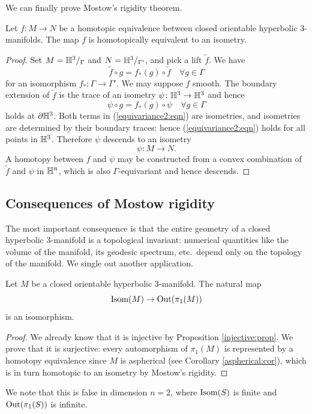 We can finally prove Mostow's rigidity theorem.
\begin{teo} Let $f\colon M \to N$ be a homotopic equivalence between closed orientable hyperbolic 3-manifolds. The map $f$ is homotopically equivalent to an isometry.
\end{teo}
\begin{proof}
Set $M = \mathbb{H}^3/_\Gamma$ and $N = \mathbb{H}^3/_{\Gamma'}$, and pick a lift $\tilde f$. We have
\begin{equation} \label{equivariance:eqn}
\tilde f\circ g = f_*(g)\circ \tilde f \quad \forall g \in \Gamma
\end{equation}
for an isomorphism $f_*\colon \Gamma \to \Gamma'$. We may suppose $f$ smooth. The boundary extension of $\tilde f$ is the trace of an isometry $\psi\colon \mathbb{H}^3 \to \mathbb{H}^3$ and hence
\begin{equation} \label{equivariance2:eqn}
\psi\circ g = f_*(g)\circ \psi \quad \forall g \in \Gamma
\end{equation}
holds at $\partial \mathbb{H}^3$. Both terms in (\ref{equivariance2:eqn}) are isometries, and isometries are determined by their boundary traces: hence (\ref{equivariance2:eqn}) holds for all points in $\mathbb{H}^3$. Therefore $\psi$ descends to an isometry 
$$\psi\colon M \to N.$$
A homotopy between $f$ and $\psi$ may be constructed from a convex combination of $\tilde f$ and $\psi$ in $\mathbb{H}^n$, which is also $\Gamma$-equivariant and hence descends.
\end{proof}

\subsection{Consequences of Mostow rigidity}
The most important consequence is that the entire geometry of a closed hyperbolic $3$-manifold is a topological invariant:  numerical quantities like the volume of the manifold, its geodesic spectrum, etc.~depend only on the topology of the manifold.
We single out another application. 

\begin{cor} Let $M$ be a closed orientable hyperbolic 3-manifold. The natural map
$${\rm Isom} (M) \to {\rm Out}(\pi_1(M))$$
is an isomorphism.
\end{cor}
\begin{proof}
We already know that it is injective by Proposition \ref{injective:prop}. We prove that it is surjective:
every automorphism of $\pi_1(M)$ is represented by a homotopy equivalence since $M$ is aspherical (see Corollary \ref{aspherical:cor}), which is in turn homotopic to an isometry by Mostow's rigidity.
\end{proof}
We note that this is false in dimension $n=2$, where ${\rm Isom}(S)$ is finite and ${\rm Out}(\pi_1(S))$ is infinite. 

